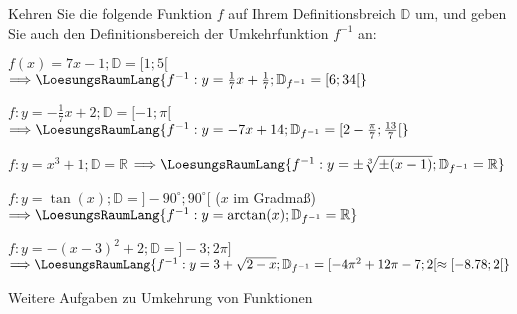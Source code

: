 

\renewcommand{\bbwAufgabenBlockID}{Finv}

\renewcommand{\metaHeaderLine}{Funktionen}
\renewcommand{\arbeitsblattTitel}{Umkehrfunktionen}



\arbeitsblattHeader{}

Kehren Sie die folgende Funktion $f$ auf Ihrem Definitionsbreich
$\mathbb{D}$ um, und geben Sie auch den Definitionsbereich der
Umkehrfunktion $f^{-1}$ an:


\begin{bbwAufgabenBlock}
\item $f(x) = 7x-1; \mathbb{D} = [1;5[$
$\Longrightarrow \LoesungsRaumLang{
f^{-1}: y=\frac17 x + \frac17; \mathbb{D}_{f^{-1}} = [6;34[
}$

\item $f:  y = -\frac17x + 2; \mathbb{D} = [-1;\pi[$
$\Longrightarrow \LoesungsRaumLang{
f^{-1}: y=-7x+14; \mathbb{D}_{f^{-1}} = [2-\frac{\pi}{7};\frac{13}{7}[
}$

\item $f:  y = x^3  + 1; \mathbb{D} = \mathbb{R}$
$\Longrightarrow \LoesungsRaumLang{
f^{-1}: y=\pm\sqrt[3]{\pm(x-1)}; \mathbb{D}_{f^{-1}} = \mathbb{R}
}$\noTRAINER{\newpage}

\item $f:  y = \tan(x); \mathbb{D} = ]-90^{\circ};90^{\circ}[$ ($x$ im Gradmaß)
$\Longrightarrow \LoesungsRaumLang{
f^{-1}: y=\arctan(x); \mathbb{D}_{f^{-1}} = \mathbb{R}
}$

\item $f:  y = -(x-3)^2 + 2; \mathbb{D} = ]-3;2\pi]$
$\Longrightarrow \LoesungsRaumLang{
f^{-1}: y=3+\sqrt{2-x}; \mathbb{D}_{f^{-1}} = [-4\pi^2+12\pi-7;2[
\approx{} [-8.78;2[
}$

\end{bbwAufgabenBlock}
\noTRAINER{\newpage}



Weitere Aufgaben zu Umkehrung von Funktionen

